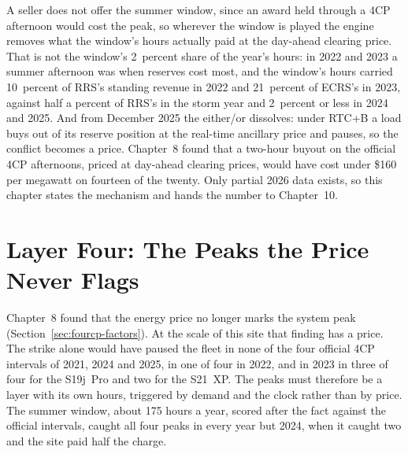 A seller does not offer the summer window, since an award held through a 4CP afternoon would cost the peak, so wherever the window is played the engine removes what the window's hours actually paid at the day-ahead clearing price. That is not the window's 2~percent share of the year's hours: in 2022 and 2023 a summer afternoon was when reserves cost most, and the window's hours carried 10~percent of RRS's standing revenue in 2022 and 21~percent of ECRS's in 2023, against half a percent of RRS's in the storm year and 2~percent or less in 2024 and 2025. %
And from December 2025 the either/or dissolves: under RTC+B a load buys out of its reserve position at the real-time ancillary price and pauses, so the conflict becomes a price. Chapter~8 found that a two-hour buyout on the official 4CP afternoons, priced at day-ahead clearing prices, would have cost under \$160 per megawatt on fourteen of the twenty. %
Only partial 2026 data exists, so this chapter states the mechanism and hands the number to Chapter~10.

\section{Layer Four: The Peaks the Price Never Flags}
\label{sec:stack-peaks}

Chapter~8 found that the energy price no longer marks the system peak (Section~\ref{sec:fourcp-factors}). At the scale of this site that finding has a price. The strike alone would have paused the fleet in none of the four official 4CP intervals of 2021, 2024 and 2025, in one of four in 2022, and in 2023 in three of four for the S19j~Pro and two for the S21~XP. %
The peaks must therefore be a layer with its own hours, triggered by demand and the clock rather than by price. The summer window, about 175 hours a year, scored after the fact against the official intervals, caught all four peaks in every year but 2024, when it caught two and the site paid half the charge. %

